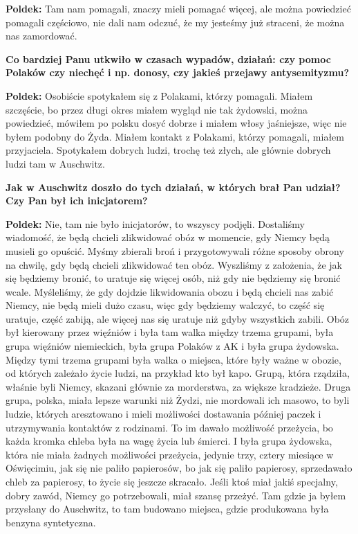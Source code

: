 \textbf{Poldek:} Tam nam pomagali, znaczy mieli pomagać więcej, ale można powiedzieć pomagali częściowo, nie dali nam odczuć, że my jesteśmy już straceni, że można nas zamordować.\par
\textbf{Co bardziej Panu utkwiło w czasach wypadów, działań: czy pomoc Polaków czy niechęć i np. donosy, czy jakieś przejawy antysemityzmu?}\par 
\textbf{Poldek:} Osobiście spotykałem się z Polakami, którzy pomagali. Miałem szczęście, bo przez długi okres miałem wygląd nie tak żydowski, można powiedzieć, mówiłem po polsku dosyć dobrze i miałem włosy jaśniejsze, więc nie byłem podobny do Żyda. Miałem kontakt z Polakami, którzy pomagali, miałem przyjaciela. Spotykałem dobrych ludzi, trochę też złych, ale głównie dobrych ludzi tam w Auschwitz.\par 
\textbf{Jak w Auschwitz doszło do tych działań, w których brał Pan udział? Czy Pan był ich inicjatorem?}\par  
\textbf{Poldek:} Nie, tam nie było inicjatorów, to wszyscy podjęli. Dostaliśmy wiadomość, że będą chcieli zlikwidować obóz w momencie, gdy Niemcy będą musieli go opuścić. Myśmy zbierali broń i przygotowywali różne sposoby obrony na chwilę, gdy będą chcieli zlikwidować ten obóz. Wyszliśmy z założenia, że jak się będziemy bronić, to uratuje się więcej osób, niż gdy nie będziemy się bronić wcale. Myśleliśmy, że gdy dojdzie likwidowania obozu i będą chcieli nas zabić Niemcy, nie będą mieli dużo czasu, więc gdy będziemy walczyć, to część się uratuje, część zabiją, ale więcej nas się uratuje niż gdyby wszystkich zabili. Obóz był kierowany przez więźniów i była tam walka między trzema grupami, była grupa więźniów niemieckich, była grupa Polaków z AK i była grupa żydowska. Między tymi trzema grupami była walka o miejsca, które były ważne w obozie, od których zależało życie ludzi, na przykład kto był kapo. Grupą, która rządziła, właśnie byli Niemcy, skazani głównie za morderstwa, za większe kradzieże. Druga grupa, polska, miała lepsze warunki niż Żydzi, nie mordowali ich masowo, to byli ludzie, których aresztowano i mieli możliwości dostawania później paczek i utrzymywania kontaktów z rodzinami. To im dawało możliwość przeżycia, bo każda kromka chleba była na wagę życia lub śmierci. I była grupa żydowska, która nie miała żadnych możliwości przeżycia, jedynie trzy, cztery miesiące w Oświęcimiu, jak się nie paliło papierosów, bo jak się paliło papierosy, sprzedawało chleb za papierosy, to życie się jeszcze skracało. Jeśli ktoś miał jakiś specjalny, dobry zawód, Niemcy go potrzebowali, miał szansę przeżyć. Tam gdzie ja byłem przysłany do Auschwitz, to tam budowano miejsca, gdzie produkowana była benzyna syntetyczna.\par 
